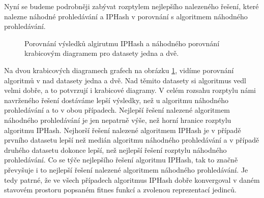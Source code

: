 Nyní se budeme podrobněji zabývat rozptylem nejlepšího nalezeného řešení, které  nalezne náhodné prohledávání a IPHash v porovnání s
algoritmem náhodného prohledávání.

\begin{figure}[!h]
	\centering
	\caption{Porovnání výsledků algirutmu IPHash a náhodného porovnání krabicovým diagramem pro datasety jedna a dvě.}
	\label{fig:basic_boxplot_1}
\end{figure}

Na dvou krabicových diagramech grafech na obrázku \ref{fig:basic_boxplot_1}, vidíme porovnání
algoritmů v nad datasety jedna a dvě. Nad těmito datasety si algoritmus vedl velmi dobře, a to potvrzují
i krabicové diagramy. V celém rozsahu rozptylu námi navrženého řešení dostáváme lepší výsledky, než u
algoritmu náhodného prohledávání a to v obou případech. Nejlepší řešení nalezené algoritmem náhodného
prohledávání je jen nepatrně výše, než horní hranice rozptylu algoritmu IPHash. Nejhorší řešení nalezené
algoritmem IPHash je v případě prvního datasetu lepší než medián algoritmu náhodného prohledávání a
v případě druhého datasetu dokonce lepší, než nejlepší řešení rozptylu náhodného prohledávání. Co se týče
nejlepšího řešení algoritmu IPHash, tak to značně převyšuje i to nejlepší řešení nalezené algoritmem
náhodného prohledávání. Je tedy patrné, že ve všech případech algoritmus IPHash dobře konvergoval v daném
stavovém prostoru popsaném fitnes funkcí a zvolenou reprezentací jedinců.

